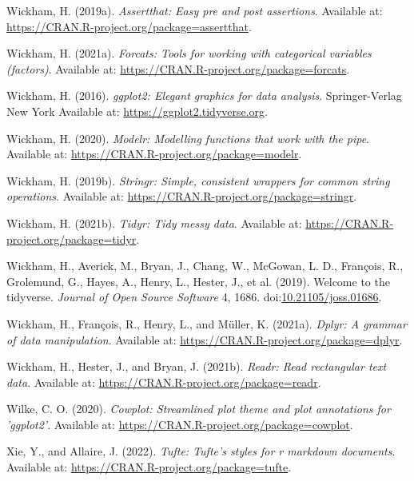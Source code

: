 \documentclass[utf8]{frontiers_suppmat} %
\newlength{\cslhangindent}
\newlength{\cslentryspacingunit} %
\newenvironment{CSLReferences}[2] %
 {%
  \setlength{\parindent}{0pt}
  \ifodd #1
  \let\oldpar\par
  \def\par{\hangindent=\cslhangindent\oldpar}
  \fi
  \setlength{\parskip}{#2\cslentryspacingunit}
 }%
 {}
\begin{document}
\begin{CSLReferences}{1}{0}
\leavevmode{}%
Wickham, H. (2019a). \emph{Assertthat: Easy pre and post assertions}. Available at: \url{https://CRAN.R-project.org/package=assertthat}.

\leavevmode{}%
Wickham, H. (2021a). \emph{Forcats: Tools for working with categorical variables (factors)}. Available at: \url{https://CRAN.R-project.org/package=forcats}.

\leavevmode{}%
Wickham, H. (2016). \emph{ggplot2: Elegant graphics for data analysis}. Springer-Verlag New York Available at: \url{https://ggplot2.tidyverse.org}.

\leavevmode{}%
Wickham, H. (2020). \emph{Modelr: Modelling functions that work with the pipe}. Available at: \url{https://CRAN.R-project.org/package=modelr}.

\leavevmode{}%
Wickham, H. (2019b). \emph{Stringr: Simple, consistent wrappers for common string operations}. Available at: \url{https://CRAN.R-project.org/package=stringr}.

\leavevmode{}%
Wickham, H. (2021b). \emph{Tidyr: Tidy messy data}. Available at: \url{https://CRAN.R-project.org/package=tidyr}.

\leavevmode{}%
Wickham, H., Averick, M., Bryan, J., Chang, W., McGowan, L. D., François, R., Grolemund, G., Hayes, A., Henry, L., Hester, J., et al. (2019). Welcome to the {tidyverse}. \emph{Journal of Open Source Software} 4, 1686. doi:\href{https://doi.org/10.21105/joss.01686}{10.21105/joss.01686}.

\leavevmode{}%
Wickham, H., François, R., Henry, L., and Müller, K. (2021a). \emph{Dplyr: A grammar of data manipulation}. Available at: \url{https://CRAN.R-project.org/package=dplyr}.

\leavevmode{}%
Wickham, H., Hester, J., and Bryan, J. (2021b). \emph{Readr: Read rectangular text data}. Available at: \url{https://CRAN.R-project.org/package=readr}.

\leavevmode{}%
Wilke, C. O. (2020). \emph{Cowplot: Streamlined plot theme and plot annotations for 'ggplot2'}. Available at: \url{https://CRAN.R-project.org/package=cowplot}.

\leavevmode{}%
Xie, Y., and Allaire, J. (2022). \emph{Tufte: Tufte's styles for r markdown documents}. Available at: \url{https://CRAN.R-project.org/package=tufte}.


\end{CSLReferences}

\endgroup
\end{document}
